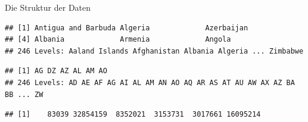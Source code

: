 \documentclass[ignorenonframetext,]{beamer}
\newenvironment{Shaded}{\begin{snugshade}}{\end{snugshade}}
\newcommand{\KeywordTok}[1]{\textcolor[rgb]{0.26,0.66,0.93}{\textbf{#1}}}
\newcommand{\NormalTok}[1]{\textcolor[rgb]{0.74,0.68,0.62}{#1}}
\newcommand{\OperatorTok}[1]{\textcolor[rgb]{0.74,0.68,0.62}{#1}}
\begin{document}
\begin{frame}[fragile]{Die Struktur der Daten}
\protect\hypertarget{die-struktur-der-daten}{}

\begin{Shaded}
\end{Shaded}

\begin{verbatim}
## [1] Antigua and Barbuda Algeria             Azerbaijan         
## [4] Albania             Armenia             Angola             
## 246 Levels: Aaland Islands Afghanistan Albania Algeria ... Zimbabwe
\end{verbatim}

\begin{Shaded}
\end{Shaded}

\begin{verbatim}
## [1] AG DZ AZ AL AM AO
## 246 Levels: AD AE AF AG AI AL AM AN AO AQ AR AS AT AU AW AX AZ BA BB ... ZW
\end{verbatim}

\begin{Shaded}
\end{Shaded}

\begin{verbatim}
## [1]    83039 32854159  8352021  3153731  3017661 16095214
\end{verbatim}

\end{frame}
\end{document}
